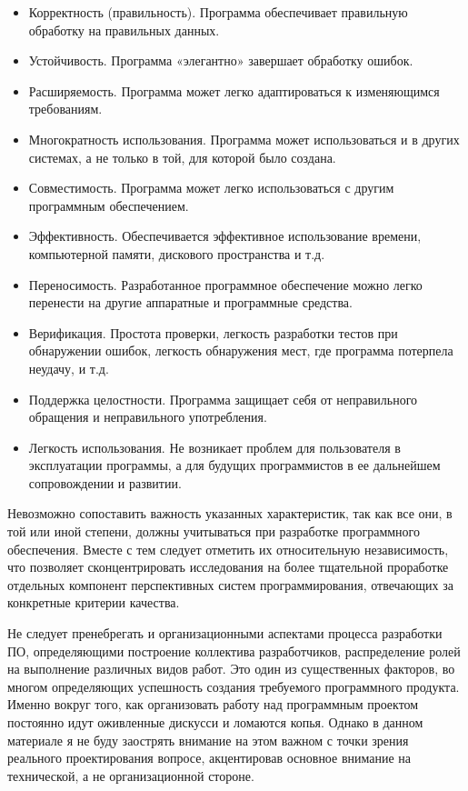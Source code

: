 \begin{itemize}
    \item Корректность (правильность). Программа обеспечивает правильную обработку на правильных данных.
    \item Устойчивость. Программа «элегантно» завершает обработку ошибок.
    \item Расширяемость. Программа может легко адаптироваться к изменяющимся требованиям.
    \item Многократность использования. Программа может использоваться и в других системах, а не только в той, для которой было создана.
    \item Совместимость. Программа может легко использоваться с другим программным обеспечением.
    \item Эффективность. Обеспечивается эффективное использование времени, компьютерной памяти, дискового пространства и т.д.
    \item Переносимость. Разработанное программное обеспечение можно легко перенести на другие аппаратные и программные средства.
    \item Верификация. Простота проверки, легкость разработки тестов при обнаружении ошибок, легкость обнаружения мест, где программа потерпела неудачу, и т.д.
    \item Поддержка целостности. Программа защищает себя от неправильного обращения и неправильного употребления.
    \item Легкость использования. Не возникает проблем для пользователя в эксплуатации программы, а для будущих программистов в ее дальнейшем сопровождении и развитии.
\end{itemize}

Невозможно сопоставить важность указанных характеристик, так как все они, в той или иной степени, должны учитываться при разработке программного обеспечения. Вместе с тем следует отметить их относительную независимость, что позволяет сконцентрировать исследования на более тщательной проработке отдельных компонент перспективных систем программирования, отвечающих за конкретные критерии качества.

Не следует пренебрегать и организационными аспектами процесса разработки ПО, определяющими построение коллектива разработчиков, распределение ролей на выполнение различных видов работ. Это один из существенных факторов, во многом определяющих успешность создания требуемого программного продукта. Именно вокруг того, как организовать работу над программным проектом постоянно идут оживленные дискусси и ломаются копья. Однако в данном материале я не буду заострять внимание на этом важном с точки зрения реального проектирования вопросе, акцентировав основное внимание на технической, а не организационной стороне.

